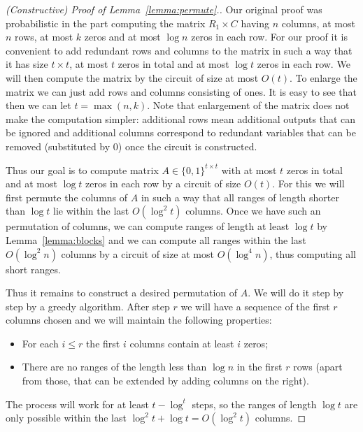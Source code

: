 \documentclass[11pt,letterpaper]{article}
\begin{document}
\begin{proof}[(Constructive) Proof of Lemma~\ref{lemma:permute}.]
Our original proof was probabilistic in the part computing the matrix $R_1 \times C$ having $n$ columns, at most $n$ rows, at most $k$ zeros and at most $\log n$ zeros in each row. For our proof it is convenient to add redundant rows and columns to the matrix in such a way that it has size $t \times t$, at most $t$ zeros in total and at most $\log t$ zeros in each row. We will then compute the matrix by the circuit of size at most $O(t)$. To enlarge the matrix we can just add rows and columns consisting of ones. It is easy to see that then we can let $t = \max(n,k)$. Note that enlargement of the matrix does not make the computation simpler: additional rows mean additional outputs that can be ignored and additional columns correspond to redundant variables that can be removed (substituted by 0) once the circuit is constructed.

Thus our goal is to compute matrix $A \in \{0,1\}^{t\times t}$ with at most $t$ zeros in total and at most $\log t$ zeros in each row by a circuit of size $O(t)$. For this we will first permute the columns of $A$ in such a way that all ranges of length shorter than $\log t$ lie within the last $O(\log^2 t)$ columns. Once we have such an permutation of columns, we can compute ranges of length at least $\log t$ by Lemma~\ref{lemma:blocks} and we can compute all ranges within the last $O(\log^2 n)$ columns by a circuit of size at most $O(\log^4 n)$, thus computing all short ranges. 

Thus it remains to construct a desired permutation of $A$. We will do it step by step by a greedy algorithm. After step $r$ we will have a sequence of the first $r$ columns chosen and we will maintain the following properties:
\begin{itemize}
\item For each $i \leq r$ the first $i$ columns contain at least $i$ zeros;
\item There are no ranges of the length less than $\log n$ in the first $r$ rows (apart from those, that can be extended by adding columns on the right).
\end{itemize}
The process will work for at least $t - \log^ t$ steps, so the ranges of length $\log t$ are only possible within the last $\log^2 t + \log t = O(\log^2 t)$ columns.


\end{proof}
\end{document}
